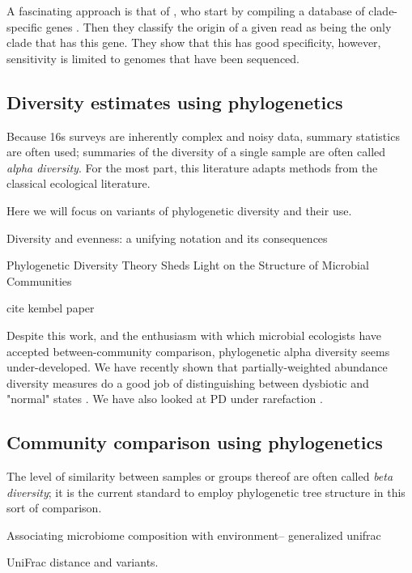 \documentclass{amsart}
\begin{document}
A fascinating approach is that of \citet{segata2012metagenomic}, who start by compiling a database of clade-specific genes \citep{segata2011metagenomic}.
Then they classify the origin of a given read as being the only clade that has this gene.
They show that this has good specificity, however, sensitivity is limited to genomes that have been sequenced.

\subsection{Diversity estimates using phylogenetics}

Because 16s surveys are inherently complex and noisy data, summary statistics are often used; summaries of the diversity of a single sample are often called \emph{alpha diversity}.
For the most part, this literature adapts methods from the classical ecological literature.

Here we will focus on variants of phylogenetic diversity and their use.

\cite{hill1973diversity}
Diversity and evenness: a unifying notation and its consequences


\cite{odwyer2012phylogenetic}
Phylogenetic Diversity Theory Sheds Light on the Structure of Microbial Communities

cite kembel paper

Despite this work, and the enthusiasm with which microbial ecologists have accepted between-community comparison, phylogenetic alpha diversity seems under-developed.
We have recently shown that partially-weighted abundance diversity measures do a good job of distinguishing between dysbiotic and "normal" states \cite{mccoy2013abundance}.
We have also looked at PD under rarefaction \cite{nipperess2013mean}.

\subsection{Community comparison using phylogenetics}

The level of similarity between samples or groups thereof are often called \emph{beta diversity}; it is the current standard to employ phylogenetic tree structure in this sort of comparison.

\cite{chen2012associating}
Associating microbiome composition with environment-- generalized unifrac

UniFrac distance and variants.
\cite{LozuponeKnightUniFrac05}
\cite{LozuponeEaWeightedUnifrac07}
\end{document}
